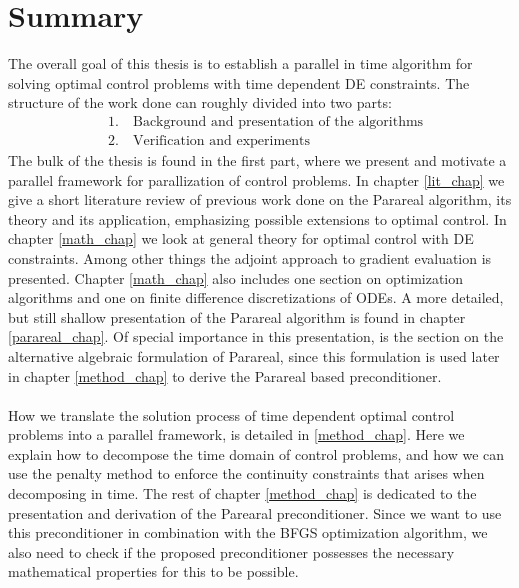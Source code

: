 \section{Summary}
The overall goal of this thesis is to establish a parallel in time algorithm for solving optimal control problems with time dependent DE constraints. The structure of the work done can roughly divided into two parts:
\begin{align*}
&1.\quad \textrm{Background and presentation of the algorithms} \\
&2.\quad \textrm{Verification and experiments}
\end{align*}
The bulk of the thesis is found in the first part, where we present and motivate a parallel framework for parallization of control problems. In chapter \ref{lit_chap} we give a short literature review of previous work done on the Parareal algorithm, its theory and its application, emphasizing possible extensions to optimal control. In chapter \ref{math_chap} we look at general theory for optimal control with DE constraints. Among other things the adjoint approach to gradient evaluation is presented. Chapter \ref{math_chap} also includes one section on optimization algorithms and one on finite difference discretizations of ODEs. A more detailed, but still shallow presentation of the Parareal algorithm is found in chapter \ref{parareal_chap}. Of special importance in this presentation, is the section on the alternative algebraic formulation of Parareal, since this formulation is used later in chapter \ref{method_chap} to derive the Parareal based preconditioner.
\\
\\
How we translate the solution process of time dependent optimal control problems into a parallel framework, is detailed in \ref{method_chap}. Here we explain how to decompose the time domain of control problems, and how we can use the penalty method to enforce the continuity constraints that arises when decomposing in time. The rest of chapter \ref{method_chap} is dedicated to the presentation and derivation of the Parearal preconditioner. Since we want to use this preconditioner in combination with the BFGS optimization algorithm, we also need to check if the proposed preconditioner possesses the necessary mathematical properties for this to be possible. 
\\
\\
